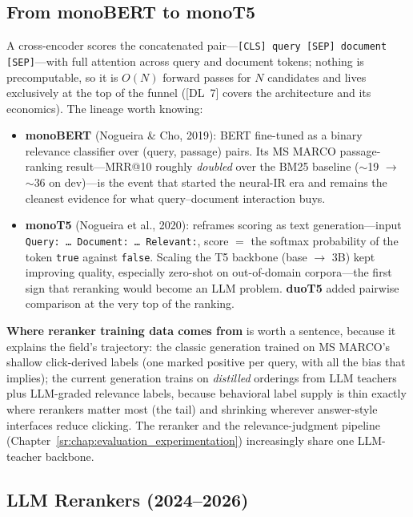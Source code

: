 \subsection{From monoBERT to monoT5}

A cross-encoder scores the concatenated pair---\texttt{[CLS] query [SEP] document [SEP]}---with full attention across query and document tokens; nothing is precomputable, so it is $O(N)$ forward passes for $N$ candidates and lives exclusively at the top of the funnel ([DL~7] covers the architecture and its economics). The lineage worth knowing:

\begin{itemize}
    \item \textbf{monoBERT} (Nogueira \& Cho, 2019): BERT fine-tuned as a binary relevance classifier over (query, passage) pairs. Its MS MARCO passage-ranking result---MRR@10 roughly \textit{doubled} over the BM25 baseline ($\sim$19 $\to$ $\sim$36 on dev)---is the event that started the neural-IR era and remains the cleanest evidence for what query--document interaction buys.
    \item \textbf{monoT5} (Nogueira et al., 2020): reframes scoring as text generation---input \texttt{Query: \ldots\ Document: \ldots\ Relevant:}, score $=$ the softmax probability of the token \texttt{true} against \texttt{false}. Scaling the T5 backbone (base $\to$ 3B) kept improving quality, especially zero-shot on out-of-domain corpora---the first sign that reranking would become an LLM problem. \textbf{duoT5} added pairwise comparison at the very top of the ranking.
\end{itemize}

\textbf{Where reranker training data comes from} is worth a sentence, because it explains the field's trajectory: the classic generation trained on MS MARCO's shallow click-derived labels (one marked positive per query, with all the bias that implies); the current generation trains on \textit{distilled} orderings from LLM teachers plus LLM-graded relevance labels, because behavioral label supply is thin exactly where rerankers matter most (the tail) and shrinking wherever answer-style interfaces reduce clicking. The reranker and the relevance-judgment pipeline (Chapter~\ref{sr:chap:evaluation_experimentation}) increasingly share one LLM-teacher backbone.

\subsection{LLM Rerankers (2024--2026)}
\label{sr:subsec:llm_rerankers}

